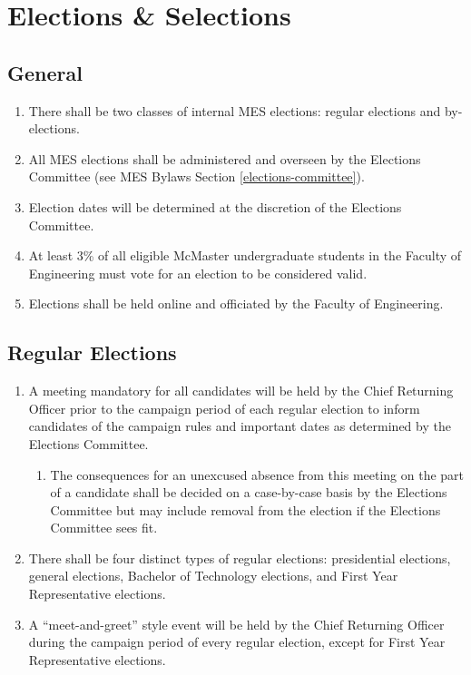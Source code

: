 \section{Elections \& Selections}
\label{elections-selections}
\subsection{General}
\label{elections-general}
\begin{enumerate}
 \item
  There shall be two classes of internal MES elections: regular elections and by-elections.
 \item
  All MES elections shall be administered and overseen by the Elections Committee (see MES Bylaws Section \ref{elections-committee}).
 \item
  Election dates will be determined at the discretion of the Elections Committee.
 \item
  At least 3\% of all eligible McMaster undergraduate students in the Faculty of Engineering must vote for an election to be considered valid.
 \item
  Elections shall be held online and officiated by the Faculty of Engineering.

\end{enumerate}

\subsection{Regular Elections}
\label{regular-elections}
\begin{enumerate}
 \item
  A meeting mandatory for all candidates will be held by the Chief Returning Officer prior to the campaign period of each regular election to inform candidates of the campaign rules and important dates as determined by the Elections Committee.

  \begin{enumerate}
   \item
    The consequences for an unexcused absence from this meeting on the part of a candidate shall be decided on a case-by-case basis by the Elections Committee but may include removal from the election if the Elections Committee sees fit.
  \end{enumerate}
 \item
  There shall be four distinct types of regular elections: presidential elections, general elections, Bachelor of Technology elections, and First Year Representative elections.
 \item
  A ``meet-and-greet'' style event will be held by the Chief Returning Officer during the campaign period of every regular election, except for First Year Representative elections.

\end{enumerate}

